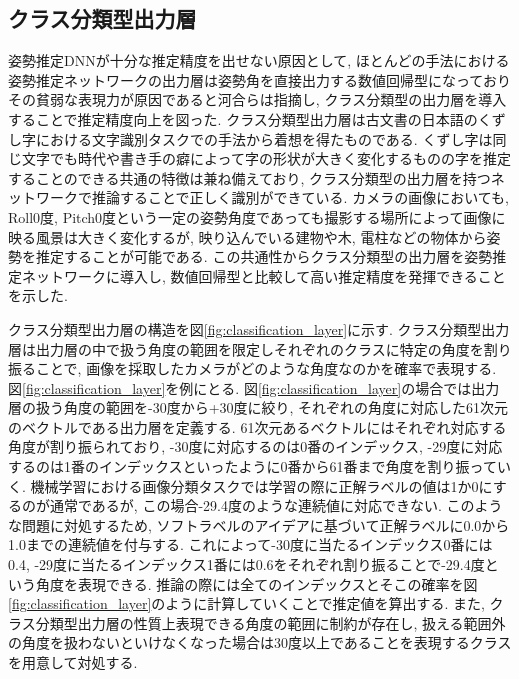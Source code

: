 \subsection{クラス分類型出力層}\label{sec3:classification_output_layer}
姿勢推定DNNが十分な推定精度を出せない原因として, ほとんどの手法における姿勢推定ネットワークの出力層は姿勢角を直接出力する数値回帰型になっておりその貧弱な表現力が原因であると河合らは指摘し, クラス分類型の出力層を導入することで推定精度向上を図った\cite{Kawai_SII2022}. クラス分類型出力層は古文書の日本語のくずし字における文字識別タスクでの手法\cite{kuzushiji_1}\cite{kuzushiji_2}から着想を得たものである. くずし字は同じ文字でも時代や書き手の癖によって字の形状が大きく変化するものの字を推定することのできる共通の特徴は兼ね備えており, クラス分類型の出力層を持つネットワークで推論することで正しく識別ができている. カメラの画像においても, Roll0度, Pitch0度という一定の姿勢角度であっても撮影する場所によって画像に映る風景は大きく変化するが, 映り込んでいる建物や木, 電柱などの物体から姿勢を推定することが可能である. この共通性からクラス分類型の出力層を姿勢推定ネットワークに導入し, 数値回帰型と比較して高い推定精度を発揮できることを示した.\par
クラス分類型出力層の構造を図\ref{fig:classification_layer}に示す. クラス分類型出力層は出力層の中で扱う角度の範囲を限定しそれぞれのクラスに特定の角度を割り振ることで, 画像を採取したカメラがどのような角度なのかを確率で表現する. 図\ref{fig:classification_layer}を例にとる. 図\ref{fig:classification_layer}の場合では出力層の扱う角度の範囲を-30度から+30度に絞り, それぞれの角度に対応した61次元のベクトルである出力層を定義する. 61次元あるベクトルにはそれぞれ対応する角度が割り振られており, -30度に対応するのは0番のインデックス, -29度に対応するのは1番のインデックスといったように0番から61番まで角度を割り振っていく. 機械学習における画像分類タスク\cite{ResNet_paper}では学習の際に正解ラベルの値は1か0にするのが通常であるが, この場合-29.4度のような連続値に対応できない. このような問題に対処するため, ソフトラベル\cite{Soft_Label_paper}のアイデアに基づいて正解ラベルに0.0から1.0までの連続値を付与する. これによって-30度に当たるインデックス0番には0.4, -29度に当たるインデックス1番には0.6をそれぞれ割り振ることで-29.4度という角度を表現できる. 推論の際には全てのインデックスとそこの確率を図\ref{fig:classification_layer}のように計算していくことで推定値を算出する. また, クラス分類型出力層の性質上表現できる角度の範囲に制約が存在し, 扱える範囲外の角度を扱わないといけなくなった場合は30度以上であることを表現するクラスを用意して対処する\cite{Kawai_SI2022}.\par

